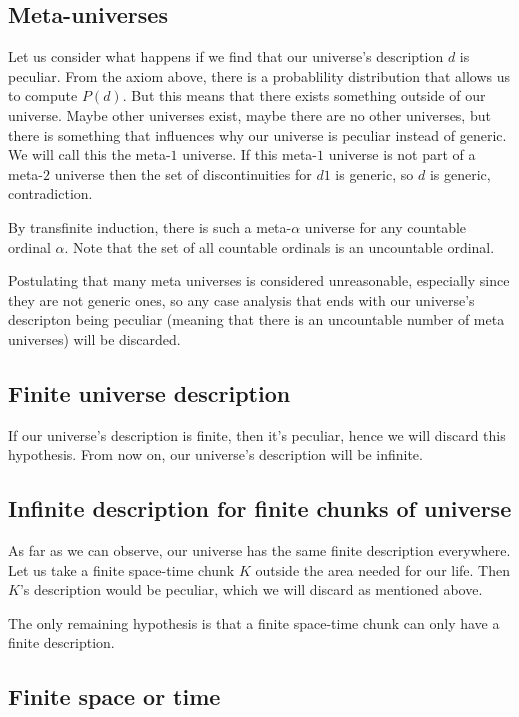 \documentclass[a4paper
,draft
]{article}
\begin{document}
\subsection{Meta-universes}

Let us consider what happens if we find that our universe's description $d$ is peculiar. From the axiom above, there is a probablility distribution that allows us to compute $P(d)$. But this means that there exists something outside of our universe. Maybe other universes exist, maybe there are no other universes, but there is something that influences why our universe is peculiar instead of generic. We will call this the meta-$1$ universe. If this meta-$1$ universe is not part of a meta-$2$ universe then the set of discontinuities for $d1$ is generic, so $d$ is generic, contradiction.

By transfinite induction, there is such a meta-$\alpha$ universe for any countable ordinal $\alpha$. Note that the set of all countable ordinals is an uncountable ordinal.

Postulating that many meta universes is considered unreasonable, especially since they are not generic ones, so any case analysis that ends with our universe's descripton being peculiar (meaning that there is an uncountable number of meta universes) will be discarded.

\subsection{Finite universe description}

If our universe's description is finite, then it's peculiar, hence we will
discard this hypothesis. From now on, our universe's description will be
infinite.

\subsection{Infinite description for finite chunks of universe}

As far as we can observe, our universe has the same finite description
everywhere. Let us take a finite space-time chunk $K$ outside the area needed
for our life. Then $K$'s description would be peculiar, which we will discard
as mentioned above.

The only remaining hypothesis is that a finite space-time chunk can only have
a finite description.

\subsection{Finite space or time}
\end{document}
